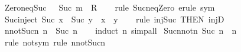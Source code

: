 \begin{isabellebody}
\endisatagproof
{\isafoldproof}%
%
\isadelimproof
\isanewline
%
\endisadelimproof
\isanewline
{}\isamarkupfalse%
\ Zero{\isacharunderscore}{\kern0pt}neq{\isacharunderscore}{\kern0pt}Suc{\isacharcolon}{\kern0pt}\ {\isachardoublequoteopen}{}\ {\isacharequal}{\kern0pt}\ Suc\ m\ {\isasymLongrightarrow}\ R{\isachardoublequoteclose}\isanewline
%
\isadelimproof
\ \ %
\endisadelimproof
%
\isatagproof
{}\isamarkupfalse%
\ {\isacharparenleft}{\kern0pt}rule\ Suc{\isacharunderscore}{\kern0pt}neq{\isacharunderscore}{\kern0pt}Zero{\isacharparenright}{\kern0pt}\ {\isacharparenleft}{\kern0pt}erule\ sym{\isacharparenright}{\kern0pt}%
\endisatagproof
{\isafoldproof}%
%
\isadelimproof
\isanewline
%
\endisadelimproof
\isanewline
{}\isamarkupfalse%
\ Suc{\isacharunderscore}{\kern0pt}inject{\isacharcolon}{\kern0pt}\ {\isachardoublequoteopen}Suc\ x\ {\isacharequal}{\kern0pt}\ Suc\ y\ {\isasymLongrightarrow}\ x\ {\isacharequal}{\kern0pt}\ y{\isachardoublequoteclose}\isanewline
%
\isadelimproof
\ \ %
\endisadelimproof
%
\isatagproof
{}\isamarkupfalse%
\ {\isacharparenleft}{\kern0pt}rule\ inj{\isacharunderscore}{\kern0pt}Suc\ {\isacharbrackleft}{\kern0pt}THEN\ injD{\isacharbrackright}{\kern0pt}{\isacharparenright}{\kern0pt}%
\endisatagproof
{\isafoldproof}%
%
\isadelimproof
\isanewline
%
\endisadelimproof
\isanewline
{}\isamarkupfalse%
\ n{\isacharunderscore}{\kern0pt}not{\isacharunderscore}{\kern0pt}Suc{\isacharunderscore}{\kern0pt}n{\isacharcolon}{\kern0pt}\ {\isachardoublequoteopen}n\ {\isasymnoteq}\ Suc\ n{\isachardoublequoteclose}\isanewline
%
\isadelimproof
\ \ %
\endisadelimproof
%
\isatagproof
{}\isamarkupfalse%
\ {\isacharparenleft}{\kern0pt}induct\ n{\isacharparenright}{\kern0pt}\ simp{\isacharunderscore}{\kern0pt}all%
\endisatagproof
{\isafoldproof}%
%
\isadelimproof
\isanewline
%
\endisadelimproof
\isanewline
{}\isamarkupfalse%
\ Suc{\isacharunderscore}{\kern0pt}n{\isacharunderscore}{\kern0pt}not{\isacharunderscore}{\kern0pt}n{\isacharcolon}{\kern0pt}\ {\isachardoublequoteopen}Suc\ n\ {\isasymnoteq}\ n{\isachardoublequoteclose}\isanewline
%
\isadelimproof
\ \ %
\endisadelimproof
%
\isatagproof
{}\isamarkupfalse%
\ {\isacharparenleft}{\kern0pt}rule\ not{\isacharunderscore}{\kern0pt}sym{\isacharparenright}{\kern0pt}\ {\isacharparenleft}{\kern0pt}rule\ n{\isacharunderscore}{\kern0pt}not{\isacharunderscore}{\kern0pt}Suc{\isacharunderscore}{\kern0pt}n{\isacharparenright}{\kern0pt}%
\endisatagproof
{\isafoldproof}%
%
\isadelimproof
%
\endisadelimproof

\end{isabellebody}
